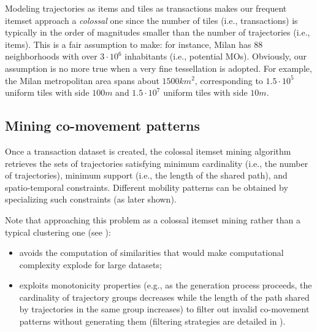 \documentclass[preprint,12pt,authoryear]{elsarticle} %
\begin{document}
Modeling trajectories as items and tiles as transactions makes our frequent itemset approach a \textit{colossal} one since the number of tiles (i.e., transactions) is typically in the order of magnitudes smaller than the number of trajectories (i.e., items). 
This is a fair assumption to make: for instance, Milan has 88 neighborhoods with over $3 \cdot 10^6$ inhabitants (i.e., potential MOs). 
Obviously, our assumption is no more true when a very fine tessellation is adopted.
For example, the Milan metropolitan area spans about $1500km^2$, corresponding to $1.5\cdot10^5$ uniform tiles with side $100m$ and $1.5\cdot10^7$ uniform tiles with side $10m$.

\subsection{Mining co-movement patterns}
Once a transaction dataset is created, the colossal itemset mining algorithm retrieves the sets of trajectories satisfying minimum cardinality (i.e., the number of trajectories), minimum support (i.e., the length of the shared path), and spatio-temporal constraints.
Different mobility patterns can be obtained by specializing such constraints (as later shown).

Note that approaching this problem as a colossal itemset mining rather than a typical clustering one (see ):
\begin{itemize}
    \item avoids the computation of similarities that would make computational complexity explode for large datasets;
    \item exploits monotonicity properties (e.g., as the generation process proceeds, the cardinality of trajectory groups decreases while the length of the path shared by trajectories in the same group increases) to filter out invalid co-movement patterns without generating them (filtering strategies are detailed in ).
\end{itemize}
\end{document}
